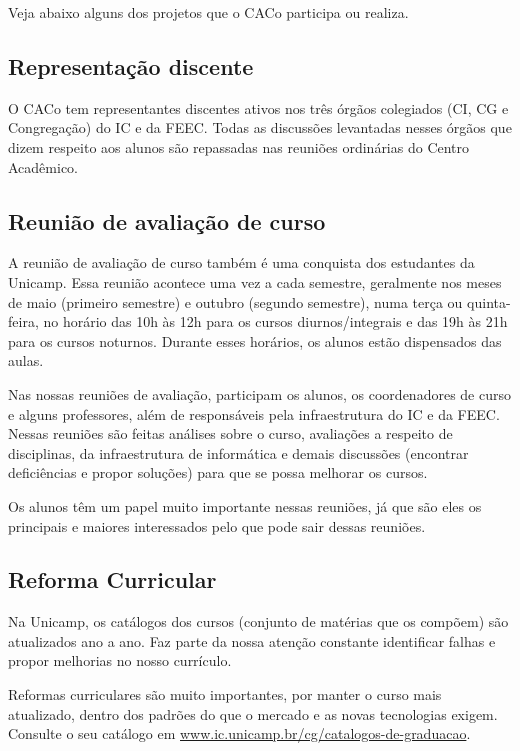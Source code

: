 Veja abaixo alguns dos projetos que o CACo participa ou realiza.

\subsection{Representação discente}

O CACo tem representantes discentes ativos nos três órgãos colegiados (CI, CG e
Congregação) do IC e da FEEC. Todas as discussões levantadas nesses órgãos que
dizem respeito aos alunos são repassadas nas reuniões ordinárias do Centro Acadêmico.

\subsection{Reunião de avaliação de curso}

A reunião de avaliação de curso também é uma conquista dos estudantes da
Unicamp. Essa reunião acontece uma vez a cada semestre, geralmente
nos meses de maio (primeiro semestre) e outubro (segundo semestre),
numa terça ou quinta-feira, no horário das 10h às 12h para os cursos
diurnos/integrais e das 19h às 21h para os cursos noturnos. Durante esses
horários, os alunos estão dispensados das aulas.

Nas nossas reuniões de avaliação, participam os alunos, os coordenadores de curso e alguns
professores, além de responsáveis pela infraestrutura do IC e da FEEC. Nessas
reuniões são feitas análises sobre o curso, avaliações a respeito de disciplinas,
da infraestrutura de informática e demais discussões (encontrar
deficiências e propor soluções) para que se possa melhorar os
cursos.

Os alunos têm um papel muito importante nessas reuniões, já que são eles os
principais e maiores interessados pelo que pode sair dessas reuniões.

\subsection{Reforma Curricular}

Na Unicamp, os catálogos dos cursos (conjunto de matérias que os compõem)
são atualizados ano a ano. Faz parte da nossa atenção constante identificar falhas
e propor melhorias no nosso currículo.

Reformas curriculares são muito importantes, por manter o curso mais atualizado,
dentro dos padrões do que o mercado e as novas tecnologias exigem. Consulte o seu
catálogo em \url{www.ic.unicamp.br/cg/catalogos-de-graduacao}.

